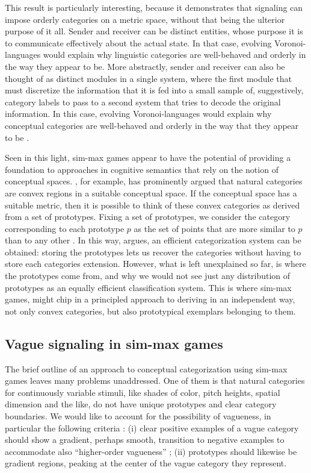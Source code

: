 This result is particularly interesting, because it demonstrates that
signaling can impose orderly categories on a metric space, without
that being the ulterior purpose of it all. Sender and receiver can be
distinct entities, whose purpose it is to communicate effectively
about the actual state. In that case, evolving Voronoi-languages would
explain why linguistic categories are well-behaved and orderly in the
way they appear to be. More abstractly, sender and receiver can also
be thought of as distinct modules in a single system, where the first
module that must discretize the information that it is fed into a
small sample of, suggestively, category labels to pass to a second
system that tries to decode the original information. In this case,
evolving Voronoi-languages would explain why conceptual categories are
well-behaved and orderly in the way that they appear to be
\citep[see][for more on this latter
interpretation]{OConnor2013:Evolving-Percep}.

Seen in this light, sim-max games appear to have the potential of
providing a foundation to approaches in cognitive semantics that rely
on the notion of conceptual spaces.
\citet[][70--77]{Gardenfors2000:Conceptual-Spac}, for example, has
prominently argued that natural categories are convex regions in a
suitable conceptual space. If the conceptual space has a suitable
metric, then it is possible to think of these convex categories as
derived from a set of prototypes. Fixing a set of prototypes, we
consider the category corresponding to each prototype $p$ as the set
of points that are more similar to $p$ than to any other
\citep[e.g.][]{OkabeBoots2000:Spatial-Tessell}. In this way,
\citet{Gardenfors2000:Conceptual-Spac} argues, an efficient
categorization system can be obtained: storing the prototypes lets us
recover the categories without having to store each categories
extension. However, what is left unexplained so far, is where the
prototypes come from, and why we would not see just any distribution
of prototypes as an equally efficient classification system. This is
where sim-max games, might chip in a principled approach to deriving
in an independent way, not only convex categories, but also
prototypical exemplars belonging to them.


\subsection{Vague signaling in sim-max games}

The brief outline of an approach to conceptual categorization using
sim-max games leaves many problems unaddressed. One of them is that
natural categories for continuously variable stimuli, like shades of
color, pitch heights, spatial dimension and the like, do not have
unique prototypes and clear category boundaries. We would like to
account for the possibility of vagueness, in particular the following
criteria
\citep[e.g.][]{Sainsbury1991:Is-There-Higher,KeefeSmith1997:Vagueness:-A-Re,Smith2008:Vagueness-and-D}:
(i) clear positive examples of a vague category should show a
gradient, perhaps smooth, transition to negative examples to
accommodate also ``higher-order vagueness'' ; (ii) prototypes should
likewise be gradient regions, peaking at the center of the vague
category they represent.


